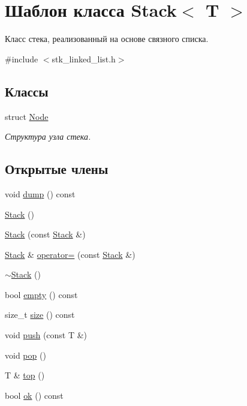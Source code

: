 \hypertarget{class_stack}{}\section{Шаблон класса Stack$<$ T $>$}
\label{class_stack}


Класс стека, реализованный на основе связного списка.  




{\ttfamily \#include $<$stk\+\_\+linked\+\_\+list.\+h$>$}

\subsection*{Классы}
\begin{DoxyCompactItemize}
\item 
struct \hyperlink{struct_stack_1_1_node}{Node}
\begin{DoxyCompactList}\small\item\em Структура узла стека. \end{DoxyCompactList}\end{DoxyCompactItemize}
\subsection*{Открытые члены}
\begin{DoxyCompactItemize}
\item 
void \hyperlink{class_stack_a7cbf14cdf70cd7a8f525590420a408e2}{dump} () const 
\item 
\hyperlink{class_stack_aefee698059467258bbd79045aca62a63}{Stack} ()
\item 
\hyperlink{class_stack_a3befb74de707bc1b4ccdb97320d4d29e}{Stack} (const \hyperlink{class_stack}{Stack} \&)
\item 
\hyperlink{class_stack}{Stack} \& \hyperlink{class_stack_a2993b44c0df1836c42ce73d0082595a7}{operator=} (const \hyperlink{class_stack}{Stack} \&)
\item 
\hyperlink{class_stack_a9e7a00875aefbdac560ab189b7bc61d1}{$\sim$\+Stack} ()
\item 
bool \hyperlink{class_stack_acd2dede1b88b54124c480fb333ca5e8c}{empty} () const 
\item 
size\+\_\+t \hyperlink{class_stack_adb03e9be26b612af1e255856c84210f5}{size} () const 
\item 
void \hyperlink{class_stack_a8e2823465d165f2cac1e6d732b856076}{push} (const T \&)
\item 
void \hyperlink{class_stack_a2723aec5c7e2611b97fcffeb7709de33}{pop} ()
\item 
T \& \hyperlink{class_stack_a8e99bab8b8f969fe5e029934ac14408a}{top} ()
\item 
bool \hyperlink{class_stack_aeb9eeb4131e61a7e267e5efce79bddfc}{ok} () const 
\end{DoxyCompactItemize}
